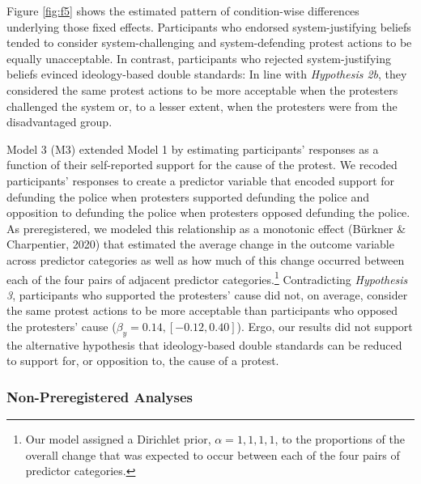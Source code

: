 \documentclass[12pt, letterpaper]{article}
\begin{document}
Figure \ref{fig:f5} shows the estimated pattern of condition-wise
differences underlying those fixed effects. Participants who endorsed
system-justifying beliefs tended to consider system-challenging and
system-defending protest actions to be equally unacceptable. In
contrast, participants who rejected system-justifying beliefs evinced
ideology-based double standards: In line with \emph{Hypothesis 2b}, they
considered the same protest actions to be more acceptable when the
protesters challenged the system or, to a lesser extent, when the
protesters were from the disadvantaged group.

Model 3 (M3) extended Model 1 by estimating participants' responses as a
function of their self-reported support for the cause of the protest. We
recoded participants' responses to create a predictor variable that
encoded support for defunding the police when protesters supported
defunding the police and opposition to defunding the police when
protesters opposed defunding the police. As preregistered, we modeled
this relationship as a monotonic effect (Bürkner \& Charpentier, 2020)
that estimated the average change in the outcome variable across
predictor categories as well as how much of this change occurred between
each of the four pairs of adjacent predictor categories.\footnote{Our
  model assigned a Dirichlet prior, \(\alpha = {1, 1, 1, 1}\), to the
  proportions of the overall change that was expected to occur between
  each of the four pairs of predictor categories.} Contradicting
\emph{Hypothesis 3}, participants who supported the protesters' cause
did not, on average, consider the same protest actions to be more
acceptable than participants who opposed the protesters' cause
(\(\beta_{y} = 0.14, [-0.12, 0.40]\)). Ergo, our results did not support
the alternative hypothesis that ideology-based double standards can be
reduced to support for, or opposition to, the cause of a protest.

\hypertarget{non-preregistered-analyses-1}{%
\subsubsection{Non-Preregistered
Analyses}\label{non-preregistered-analyses-1}}
\end{document}
